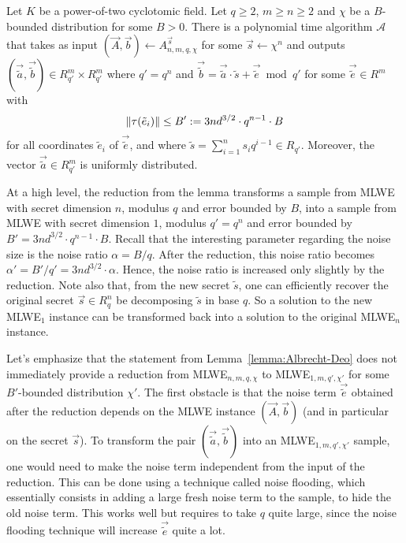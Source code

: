 \begin{lemma}
\label{lemma:Albrecht-Deo}
Let $K$ be a power-of-two cyclotomic field.
Let $q \geq 2$, $m \geq n \geq 2$ and $\chi$ be a $B$-bounded distribution for some $B > 0$. There is a polynomial time 
algorithm $\mathcal{A}$ that takes as input $(\vec A, \vec b) \leftarrow A^{\vec s}_{n,m,q,\chi}$ for some $\vec s \leftarrow \chi^n$ and outputs $(\vec{\tilde{a}}, \vec{\tilde{b}}) \in R_{q'}^m \times R_{q'}^m$ where $q' = q^n$ and $\vec{\tilde{b}} = \vec{\tilde{a}} \cdot \tilde{s} + \vec{\tilde{e}} \bmod q'$ for some $\vec{\tilde{e}} \in R^m$ with 
\[\|\tau(\tilde{e}_i) \| \leq B' := 3nd^{3/2} \cdot q^{n-1} \cdot B\] 
for all coordinates $\tilde{e}_i$ of $\vec{\tilde{e}}$, and where $\tilde{s} = \sum_{i=1}^n s_i q^{i-1} \in R_{q'}$. Moreover, the vector $\vec{\tilde{a}} \in R_{q'}^m$ is uniformly distributed.
\end{lemma}
At a high level, the reduction from the lemma transforms a sample from MLWE with secret dimension $n$, modulus $q$ and error bounded by $B$, into a sample from MLWE with secret dimension $1$, modulus $q' = q^n$ and error bounded by $B' = 3nd^{3/2} \cdot q^{n-1} \cdot B$. Recall that the interesting parameter regarding the noise size is the noise ratio $\alpha = B/q$. After the reduction, this noise ratio becomes $\alpha' = B'/q' = 3nd^{3/2} \cdot  \alpha$. Hence, the noise ratio is increased only slightly by the reduction. %
Note also that, from the new secret $\tilde{s}$, one can efficiently recover the original secret $\vec s \in R_{q}^n$ be decomposing $\tilde{s}$ in base $q$. So a solution to the new MLWE$_1$ instance can be transformed back into a solution to the original MLWE$_n$ instance.

Let's emphasize that the statement from Lemma~\ref{lemma:Albrecht-Deo} does not immediately provide a reduction from MLWE$_{n,m,q,\chi}$ to MLWE$_{1,m,q',\chi'}$ for some $B'$-bounded distribution $\chi'$. The first obstacle is that the noise term $\vec{\tilde{e}}$ obtained after the reduction depends on the MLWE instance $(\vec A, \vec b)$ (and in particular on the secret $\vec s$). To transform the pair $(\vec{\tilde{a}},\vec{ \tilde{b}})$ into an MLWE$_{1,m,q',\chi'}$ sample, one would need to make the noise term independent from the input of the reduction. This can be done using a technique called noise flooding, which essentially consists in adding a large fresh noise term to the sample, to hide the old noise term. This works well but requires to take $q$ quite large, since the noise flooding technique will increase $\vec{\tilde{e}}$ quite a lot.

